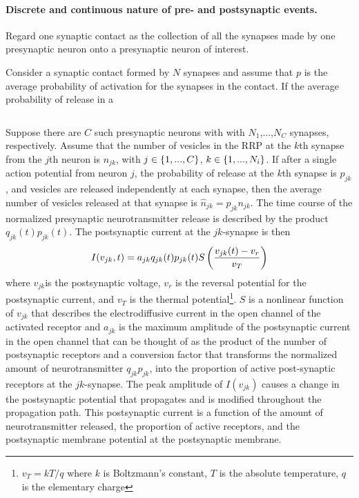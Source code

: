 \paragraph{Discrete and continuous nature of pre- and postsynaptic events. }

Regard one synaptic contact as the collection of all the synapses made by one presynaptic neuron onto a presynaptic neuron of interest. 

Consider a synaptic contact formed by $N$ synapses and assume that  $p$ is the average probability of activation for the synapses in the contact. If the average probability of release in a 

\begin{equation}
    
\end{equation}


Suppose there are $C$ such presynaptic neurons with with $N_1$,...,$N_C$ synapses, respectively.
Assume that the number of vesicles in the RRP at the $k$th synapse from the $j$th neuron is  $n_{jk}$, with $j \in \left\{1,...,C\right\}$, $k\in \left\{1,...,N_i\right\}$. If after a single action potential from neuron $j$, the probability of release at the $k$th synapse is $p_{jk}$, and vesicles are released independently at each synapse, then the average number of vesicles released at that synapse is $\hat{n}_{jk} = p_{jk} n_{jk}$. The time course of the normalized presynaptic neurotransmitter release is described by the product $q_{jk}(t) p_{jk}(t)$. 
The postsynaptic current at the $jk$-synapse is then
\begin{equation} 
I(v_{jk}, t)= {a}_{jk} q_{jk}(t) p_{jk}(t)  S\left( \frac{v_{jk}(t)-v_r}{v_T}\right)
\end{equation}
where  $v_{jk}$is the postsynaptic voltage, $v_r$ is the reversal potential for the postsynaptic current, and $v_T$ is the thermal potential\footnote{$v_T= kT/q$ where $k$ is Boltzmann's constant, $T$ is the absolute temperature,  $q$ is the elementary charge}.  $S$ is a nonlinear function of $v_{jk}$ that describes the electrodiffusive current in the open channel of the activated receptor and $a_{jk}$ is the maximum amplitude of the postsynaptic current in the open channel that can be thought of as the product of the number of postsynaptic receptors and a conversion factor that transforms the normalized amount of neurotransmitter $q_{jk} p_{jk}$, into the proportion of active post-synaptic receptors at the $jk$-synapse.
The peak amplitude of $I(v_{jk})$ causes a change in the postsynaptic potential that propagates and is modified throughout the propagation path. This postsynaptic current is a function of the amount of neurotransmitter released, the proportion of active receptors, and the postsynaptic membrane potential at the postsynaptic membrane.  

